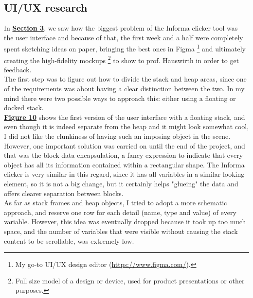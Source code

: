 \documentclass[]{usiinfbachelorproject}
\begin{document}
\subsection{UI/UX research} \label{ui-ux research}

In \hyperref[requirements+analysis]{\textbf{Section 3}}, we saw how the biggest problem of the Informa clicker tool was the user interface and because of that, the first week and a half were completely spent sketching ideas on paper, bringing the best ones in Figma \footnote{My go-to UI/UX design editor (\url{https://www.figma.com/}).} and ultimately creating the high-fidelity mockups \footnote{Full size model of a design or device, used for product presentations or other purposes.} to show to prof. Hauswirth in order to get feedback.\\
The first step was to figure out how to divide the stack and heap areas, since one of the requirements was about having a clear distinction between the two. In my mind there were two possible ways to approach this: either using a floating or docked stack.\\

\noindent \hyperref[floating stack]{\textbf{Figure 10}} shows the first version of the user interface with a floating stack, and even though it is indeed separate from the heap and it might look somewhat cool, I did not like the clunkiness of having such an imposing object in the scene. However, one important solution was carried on until the end of the project, and that was the block data encapsulation, a fancy expression to indicate that every object has all its information contained within a rectangular shape. The Informa clicker is very similar in this regard, since it has all variables in a similar looking element, so it is not a big change, but it certainly helps "glueing" the data and offers clearer separation between blocks.\\
As far as stack frames and heap objects, I tried to adopt a more schematic approach, and reserve one row for each detail (name, type and value) of every variable. However, this idea was eventually dropped because it took up too much space, and the number of variables that were visible without causing the stack content to be scrollable, was extremely low. 
\end{document}
